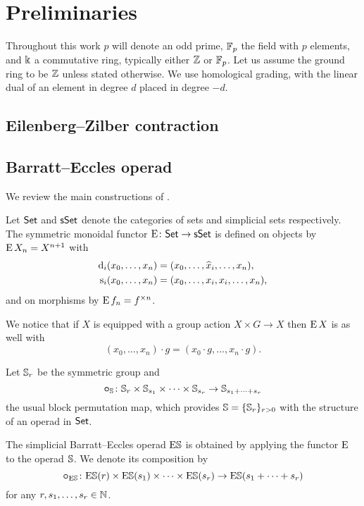 
\section{Preliminaries}

Throughout this work $p$ will denote an odd prime, ${\mathbb{F}_p}$ the field with $p$ elements, and $\Bbbk$ a commutative ring, typically either $\mathbb{Z}$ or ${\mathbb{F}_p}$.
Let us assume the ground ring to be $\mathbb{Z}$ unless stated otherwise.
We use homological grading, with the linear dual of an element in degree $d$ placed in degree $-d$.

\subsection{Eilenberg--Zilber contraction}

\TBW

\subsection{Barratt--Eccles operad}

We review the main constructions of \cite{berger2004combinatorial}.

\sssec

Let $\mathsf{Set}$ and $\mathsf{sSet}$ denote the categories of sets and simplicial sets respectively.
The symmetric monoidal functor $\operatorname{E} \colon \mathsf{Set} \to \mathsf{sSet}$ is defined on objects by $\operatorname{E} X_n = X^{n+1}$ with
\[
\begin{split}
	\operatorname{d}_i(x_0,\dots,x_n) &= (x_0,\dots,\widehat{x}_i,\dots,x_n), \\
	\operatorname{s}_i(x_0,\dots,x_n) &= (x_0, \dots, x_i, x_i, \dots, x_n),
\end{split}
\]
and on morphisms by $\operatorname{E} f_n = f^{\times n}$.

We notice that if $X$ is equipped with a group action $X \times G \to X$ then $\operatorname{E} X$ is as well with
\[
(x_0,\dots,x_n) \cdot g = (x_0 \cdot g, \dots, x_n \cdot g).
\]

\sssec

Let $\mathbb{S}_r$ be the symmetric group and
\[
\bm{\circ}_{\mathbb{S}} \colon \mathbb{S}_r \times \mathbb{S}_{s_1} \times \cdots \times \mathbb{S}_{s_r} \to \mathbb{S}_{s_1+\dots+s_r}
\]
the usual block permutation map, which provides $\mathbb{S} = \{\mathbb{S}_r\}_{r>0}$ with the structure of an operad in $\mathsf{Set}$.

\sssec

The simplicial Barratt--Eccles operad $\mathrm{E}\mathbb{S}$ is obtained by applying the functor $\operatorname{E}$ to the operad $\mathbb{S}$.
We denote its composition by
\[
\bm{\circ}_{\mathrm{E}\mathbb{S}} \colon \mathrm{E}\mathbb{S}(r) \times \mathrm{E}\mathbb{S}(s_1) \times\dots\times \mathrm{E}\mathbb{S}(s_r) \to \mathrm{E}\mathbb{S}(s_1+\dots+s_r)
\]
for any $r,s_1,\dots,s_r \in \mathbb{N}$.

